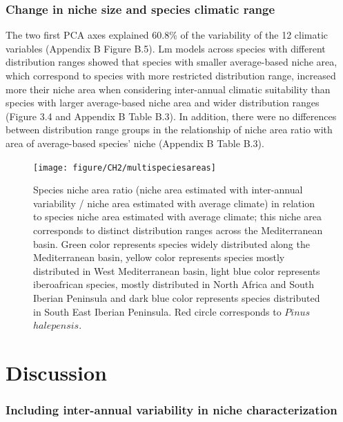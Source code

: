 \documentclass[11pt,twoside]{reedthesis}
\begin{document}
\subsubsection{Change in niche size and species climatic
range}\label{change-in-niche-size-and-species-climatic-range-1}

The two first PCA axes explained 60.8\% of the variability of the 12
climatic variables (Appendix B Figure B.5). Lm models across species
with different distribution ranges showed that species with smaller
average-based niche area, which correspond to species with more
restricted distribution range, increased more their niche area when
considering inter-annual climatic suitability than species with larger
average-based niche area and wider distribution ranges (Figure 3.4 and
Appendix B Table B.3). In addition, there were no differences between
distribution range groups in the relationship of niche area ratio with
area of average-based species' niche (Appendix B Table B.3).\par

\setlength{\abovecaptionskip}{10pt}
\begin{figure}[hbt!]

{\centering \texttt{[image: figure/CH2/multispeciesareas]} 

}

\caption[Species niche area ratio in relation to species niche area estimated with average climate]{Species niche area ratio (niche area estimated with inter-annual variability / niche area estimated with average climate) in relation to species niche area estimated with average climate; this niche area corresponds to distinct distribution ranges across the Mediterranean basin. Green color represents species widely distributed along the Mediterranean basin, yellow color represents species mostly distributed in West Mediterranean basin, light blue color represents iberoafrican species, mostly distributed in North Africa and South Iberian Peninsula and dark blue color represents species distributed in South East Iberian Peninsula. Red circle corresponds to $Pinus$ $halepensis$.}\label{fig:Ch2plot4}
\end{figure}
\section{Discussion}\label{discussion-1}

\subsubsection{Including inter-annual variability in niche
characterization}\label{including-inter-annual-variability-in-niche-characterization}
\end{document}
